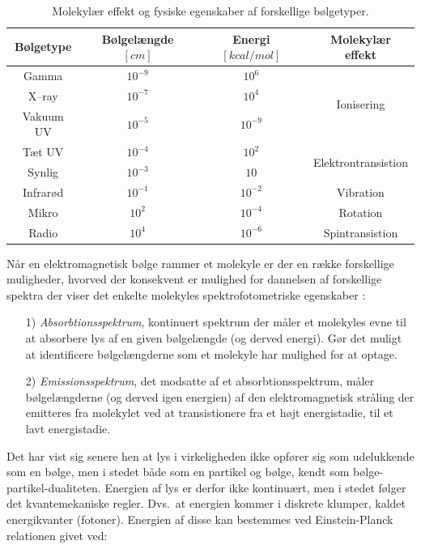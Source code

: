     \begin{table}[H]\centering
        \caption{Molekylær effekt og fysiske egenskaber af forskellige bølgetyper.}
        \begin{tabular}{cccc}
            \toprule
            Bølgetype & Bølgelængde $\left[\si{cm}\right]$ & Energi $\left[\si{kcal\per mol}\right]$ & Molekylær effekt \\
            \midrule
            Gamma & $10^{-9}$ & $10^6$ & \multirow{3}{*}{Ionisering} \\
            X--ray & $10^{-7}$ & $10^4$ \\
            Vakuum UV & $10^{-5}$ & $10^{-9}$ \\
            \midrule
            Tæt UV & $10^{-4}$ & $10^2$ & \multirow{2}{*}{Elektrontransistion} \\
            Synlig & $10^{-3}$ & $10$ \\
            \midrule
            Infrarød & $10^{-1}$ & $10^{-2}$ & Vibration \\
            Mikro & $10^2$ & $10^{-4}$ & Rotation \\
            Radio & $10^4$ & $10^{-6}$ & Spintransistion \\
            \bottomrule
        \end{tabular}
    \end{table}
    Når en elektromagnetisk bølge rammer et molekyle er der en række forskellige muligheder, hvorved der konsekvent er mulighed for dannelsen af forskellige spektra der viser det enkelte molekyles spektrofotometriske egenskaber \parencite{Finn2020}:
    \begin{itemize}
        \item[1)] \textit{Absorbtionsspektrum}, kontinuert spektrum der måler et molekyles evne til at absorbere lys af en given bølgelængde (og derved energi). Gør det muligt at identificere bølgelængderne som et molekyle har mulighed for at optage.
        \item[2)] \textit{Emissionsspektrum}, det modsatte af et absorbtionsspektrum, måler bølgelængderne (og derved igen energien) af den elektromagnetisk stråling der emitteres fra molekylet ved at transistionere fra et højt energistadie, til et lavt energistadie.
    \end{itemize}
    Det har vist sig senere hen at lys i virkeligheden ikke opfører sig som udelukkende som en bølge, men i stedet både som en partikel og bølge, kendt som bølge-partikel-dualiteten. Energien af lys er derfor ikke kontinuært, men i stedet følger det kvantemekaniske regler. Dvs.\ at energien kommer i diskrete klumper, kaldet energikvanter (fotoner). Energien af disse kan bestemmes ved Einstein-Planck relationen givet ved:
